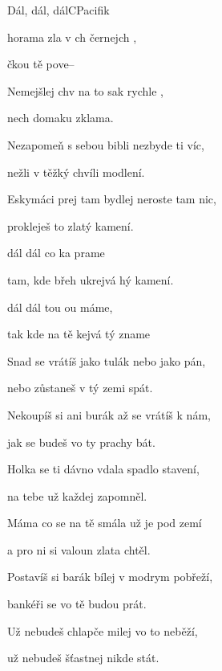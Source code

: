 \setcounter{page}{17}
\begin{song}{Dál, dál, dál}{C}{Pacifik}
  \begin{SBVerse}
 horama zla v ch černejch ,

čkou tě  pove--

Nemejšlej chv na to sak rychle ,

nech domaku zklama.
\end{SBVerse}
\begin{SBVerse}
Nezapomeň s sebou bibli nezbyde ti víc,

nežli v těžký chvíli modlení.

Eskymáci prej tam bydlej neroste tam nic,

prokleješ to zlatý kamení.

\end{SBVerse}

\begin{SBChorus}
 dál dál co ka prame

tam, kde břeh ukrejvá hý kamení.

 dál dál tou ou máme,

tak kde na tě kejvá tý zname
\end{SBChorus}

\begin{SBVerse}
Snad se vrátíš jako tulák nebo jako pán,

nebo zůstaneš v tý zemi spát.

Nekoupíš si ani burák až se vrátíš k nám,

jak se budeš vo ty prachy bát.
\end{SBVerse}
\begin{SBVerse}
Holka se ti dávno vdala spadlo stavení,

na tebe už každej zapomněl.

Máma co se na tě smála už je pod zemí 

a pro ni si valoun zlata chtěl.
\end{SBVerse}

\begin{SBChorus}
\end{SBChorus}

\begin{SBVerse}
Postavíš si barák bílej v modrym pobřeží,

bankéři se vo tě budou prát.

Už nebudeš chlapče milej vo to neběží,

už nebudeš šťastnej nikde stát.
\end{SBVerse}

\begin{SBChorus}
\end{SBChorus}
\end{song}
\pagebreak
